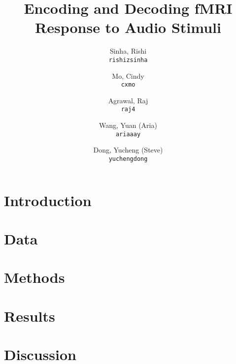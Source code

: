 \documentclass[12pt]{article}
\title{Encoding and Decoding fMRI Response to Audio Stimuli}
\author{
  Sinha, Rishi\\
  \texttt{rishizsinha}
  \and
  Mo, Cindy\\
  \texttt{cxmo}
  \and
  Agrawal, Raj\\
  \texttt{raj4}
  \and
  Wang, Yuan (Aria)\\
  \texttt{ariaaay}
  \and
  Dong, Yucheng (Steve)\\
  \texttt{yuchengdong}
}
\begin{document}
\maketitle{}

\abstract{}


\section{Introduction}
        

\section{Data}
        

\section{Methods}
        

\section{Results}
		
        
\section{Discussion}
		



\end{document}
